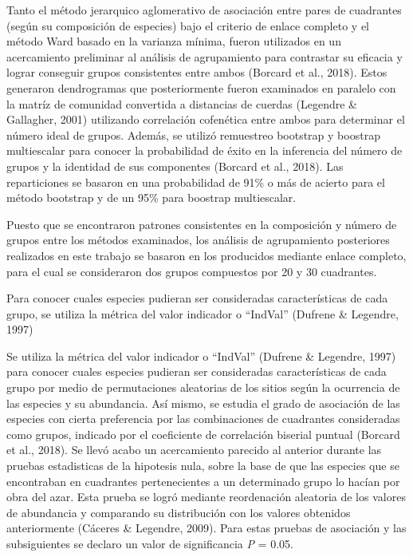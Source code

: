 \documentclass[11pt,]{article}
\begin{document}
Tanto el método jerarquico aglomerativo de asociación entre pares de
cuadrantes (según su composición de especies) bajo el criterio de enlace
completo y el método Ward basado en la varianza mínima, fueron
utilizados en un acercamiento preliminar al análisis de agrupamiento
para contrastar su eficacia y lograr conseguir grupos consistentes entre
ambos (Borcard et al., 2018). Estos generaron dendrogramas que
posteriormente fueron examinados en paralelo con la matríz de comunidad
convertida a distancias de cuerdas (Legendre \& Gallagher, 2001)
utilizando correlación cofenética entre ambos para determinar el número
ideal de grupos. Además, se utilizó remuestreo bootstrap y boostrap
multiescalar para conocer la probabilidad de éxito en la inferencia del
número de grupos y la identidad de sus componentes (Borcard et al.,
2018). Las reparticiones se basaron en una probabilidad de 91\% o más de
acierto para el método bootstrap y de un 95\% para boostrap
multiescalar.

Puesto que se encontraron patrones consistentes en la composición y
número de grupos entre los métodos examinados, los análisis de
agrupamiento posteriores realizados en este trabajo se basaron en los
producidos mediante enlace completo, para el cual se consideraron dos
grupos compuestos por 20 y 30 cuadrantes.

Para conocer cuales especies pudieran ser consideradas características
de cada grupo, se utiliza la métrica del valor indicador o ``IndVal''
(Dufrene \& Legendre, 1997)

Se utiliza la métrica del valor indicador o ``IndVal'' (Dufrene \&
Legendre, 1997) para conocer cuales especies pudieran ser consideradas
características de cada grupo por medio de permutaciones aleatorias de
los sitios según la ocurrencia de las especies y su abundancia. Así
mismo, se estudia el grado de asociación de las especies con cierta
preferencia por las combinaciones de cuadrantes consideradas como
grupos, indicado por el coeficiente de correlación biserial puntual
(Borcard et al., 2018). Se llevó acabo un acercamiento parecido al
anterior durante las pruebas estadisticas de la hipotesis nula, sobre la
base de que las especies que se encontraban en cuadrantes pertenecientes
a un determinado grupo lo hacían por obra del azar. Esta prueba se logró
mediante reordenación aleatoria de los valores de abundancia y
comparando su distribución con los valores obtenidos anteriormente
(Cáceres \& Legendre, 2009). Para estas pruebas de asociación y las
subsiguientes se declaro un valor de significancia \emph{P} = 0.05.
\end{document}
